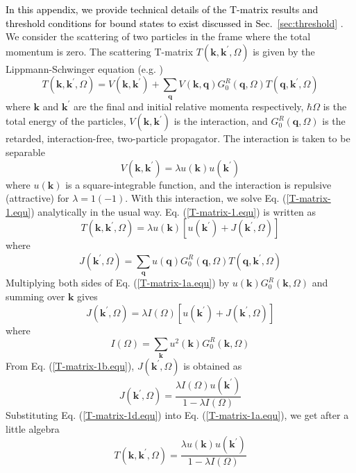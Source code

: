 \documentclass[aps,prb,superscriptaddress,letterpaper,amsmath,amssymb,twocolumn,preprintnumbers]{revtex4}
\newcommand\revisionB[1]{\textcolor{black}{#1}}
\begin{document}
\revisionB{
 In this appendix, we provide technical details of the T-matrix results and threshold conditions for bound states to exist discussed
in Sec.\ \ref{sec:threshold}
}.
%
We consider the scattering of two particles in the frame where the total momentum is zero. The scattering T-matrix $T(\mathbf{k},\mathbf{k}^{\prime},\Omega)$ is given by the Lippmann-Schwinger equation (e.g. \cite{taylor.72})
\begin{equation}\label{T-matrix-1.equ}
T(\mathbf{k},\mathbf{k}^{\prime},\Omega)=V(\mathbf{k},\mathbf{k}^{\prime})+\sum_{\mathbf{q}%
}V(\mathbf{k},\mathbf{q})G_{0}^{R}(\mathbf{q},\Omega)T(\mathbf{q},\mathbf{k}^{\prime},\Omega)
\end{equation}
where $\mathbf{k}$ and $\mathbf{k}^\prime$ are the final and initial relative momenta respectively, $\hbar \Omega$ is the total energy of the particles, $V(\mathbf{k}, \mathbf{k}^{\prime})$ is the interaction, and $G_{0}^{R}(\mathbf{q},\Omega)$ is the retarded, interaction-free, two-particle propagator.
%
The interaction is taken to be separable
\begin{equation}\label{separable-1.equ}
V(\mathbf{k}, \mathbf{k}^{\prime}) = \lambda u(\mathbf{k}) u(\mathbf{k}^{\prime})
\end{equation}
where $u(\mathbf{k})$ is a square-integrable function, and the interaction is repulsive (attractive) for $\lambda = 1 (-1)$. With this interaction, we solve Eq. (\ref{T-matrix-1.equ}) analytically in the usual way. Eq. (\ref{T-matrix-1.equ}) is written as
\begin{equation}\label{T-matrix-1a.equ}
T(\mathbf{k},\mathbf{k}^{\prime},\Omega)=\lambda u(\mathbf{k}) \left[ u(\mathbf{k}^{\prime}) + J(\mathbf{k}^{\prime},\Omega) \right]
\end{equation}
where
\begin{equation}
J(\mathbf{k}^{\prime},\Omega) = \sum_{\mathbf{q}} u(\mathbf{q})G_{0}^{R}(\mathbf{q},\Omega)T(\mathbf{q},\mathbf{k}^{\prime},\Omega)
\end{equation}
Multiplying both sides of Eq. (\ref{T-matrix-1a.equ}) by $u(\mathbf{k}) G_{0}^{R}(\mathbf{k},\Omega)$ and summing over $\mathbf{k}$ gives
\begin{equation}\label{T-matrix-1b.equ}
J(\mathbf{k}^{\prime},\Omega)=\lambda I(\Omega) \left[ u(\mathbf{k}^{\prime}) + J(\mathbf{k}^{\prime},\Omega) \right]
\end{equation}
where
\begin{equation}\label{T-matrix-1c.equ}
I(\Omega) = \sum_{\mathbf{k}} u^2(\mathbf{k})G_{0}^{R}(\mathbf{k},\Omega)
\end{equation}
From Eq. (\ref{T-matrix-1b.equ}), $J(\mathbf{k}^{\prime},\Omega)$ is obtained as
\begin{equation}\label{T-matrix-1d.equ}
J(\mathbf{k}^{\prime},\Omega)=\frac{\lambda I(\Omega) u(\mathbf{k}^{\prime})} {1 - \lambda I(\Omega)}
\end{equation}
Substituting Eq. (\ref{T-matrix-1d.equ}) into Eq. (\ref{T-matrix-1a.equ}), we get after a little algebra
\begin{equation}\label{T-matrix-1-soln.equ}
T(\mathbf{k},\mathbf{k}^{\prime},\Omega)=\frac{\lambda u(\mathbf{k}) u(\mathbf{k}^{\prime})} {1 - \lambda I(\Omega)}
\end{equation}
\end{document}
